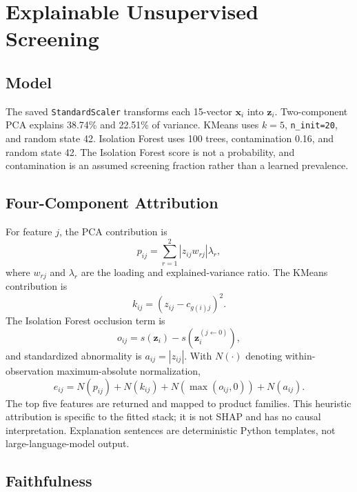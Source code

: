 \documentclass[conference]{IEEEtran}
\begin{document}
\section{Explainable Unsupervised Screening}

\subsection{Model}

The saved \texttt{StandardScaler} transforms each 15-vector \(\mathbf{x}_i\) into \(\mathbf{z}_i\). Two-component PCA explains 38.74\% and 22.51\% of variance. KMeans uses \(k=5\), \texttt{n\_init=20}, and random state 42. Isolation Forest uses 100 trees, contamination 0.16, and random state 42. The Isolation Forest score is not a probability, and contamination is an assumed screening fraction rather than a learned prevalence.

\subsection{Four-Component Attribution}

For feature \(j\), the PCA contribution is
\begin{equation}
p_{ij}=\sum_{r=1}^{2}|z_{ij}w_{rj}|\lambda_r ,
\end{equation}
where \(w_{rj}\) and \(\lambda_r\) are the loading and explained-variance ratio. The KMeans contribution is
\begin{equation}
k_{ij}=(z_{ij}-c_{g(i)j})^2 .
\end{equation}
The Isolation Forest occlusion term is
\begin{equation}
o_{ij}=s(\mathbf{z}_i)-s(\mathbf{z}_i^{(j\leftarrow0)}),
\end{equation}
and standardized abnormality is \(a_{ij}=|z_{ij}|\). With \(N(\cdot)\) denoting within-observation maximum-absolute normalization,
\begin{equation}
e_{ij}=N(p_{ij})+N(k_{ij})+N(\max(o_{ij},0))+N(a_{ij}).
\end{equation}
The top five features are returned and mapped to product families. This heuristic attribution is specific to the fitted stack; it is not SHAP and has no causal interpretation. Explanation sentences are deterministic Python templates, not large-language-model output.

\subsection{Faithfulness}
\end{document}
